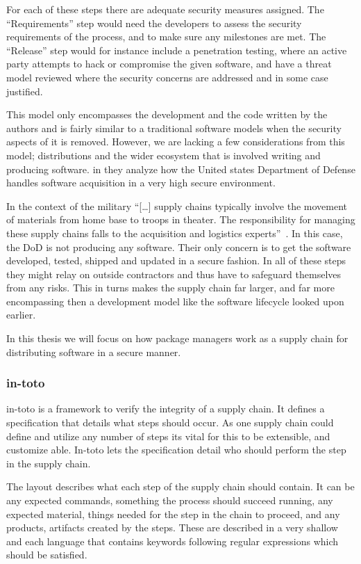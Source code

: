 \documentclass[../Main/thesis.tex]{subfiles}
\begin{document}
For each of these steps there are adequate security measures assigned. The
``Requirements'' step would need the developers to assess the security
requirements of the process, and to make sure any milestones are met. The
``Release'' step would for instance include a penetration testing, where an
active party attempts to hack or compromise the given software, and have a
threat model reviewed where the security concerns are addressed and in some case
justified.

This model only encompasses the development and the code written by the authors
and is fairly similar to a traditional software models when the security aspects
of it is removed. However, we are lacking a few considerations from this model;
distributions and the wider ecosystem that is involved writing and producing
software. \citeauthor{rj-ellison-2010} in  they
analyze how the United states Department of Defense handles software acquisition
in a very high secure environment. 


In the context of the military ``[\dots] supply chains typically
involve the movement of materials from home base to troops in theater. The
responsibility for managing these supply chains falls to the acquisition and
logistics experts''~\cite{rj-ellison-2010}. In this case, the DoD is not
producing any software. Their only concern is to get the software developed,
tested, shipped and updated in a secure fashion. In all of these steps they
might relay on outside contractors and thus have to safeguard themselves from
any risks. This in turns makes the supply chain far larger, and far more
encompassing then a development model like the software lifecycle looked upon
earlier.

In this thesis we will focus on how package managers work as a supply chain for
distributing software in a secure manner.


\subsubsection*{in-toto}
in-toto is a framework to verify the integrity of a supply chain. It defines a
specification that details what steps should occur. As one supply chain could
define and utilize any number of steps its vital for this to be extensible, and
customize able. In-toto lets the specification detail who should perform the
step in the supply chain.

The layout describes what each step of the supply chain should contain. It can
be any expected commands, something the process should succeed running, any
expected material, things needed for the step in the chain to proceed, and any
products, artifacts created by the steps. These are described in a very shallow
and each language that contains keywords following regular expressions which
should be satisfied.
\end{document}
